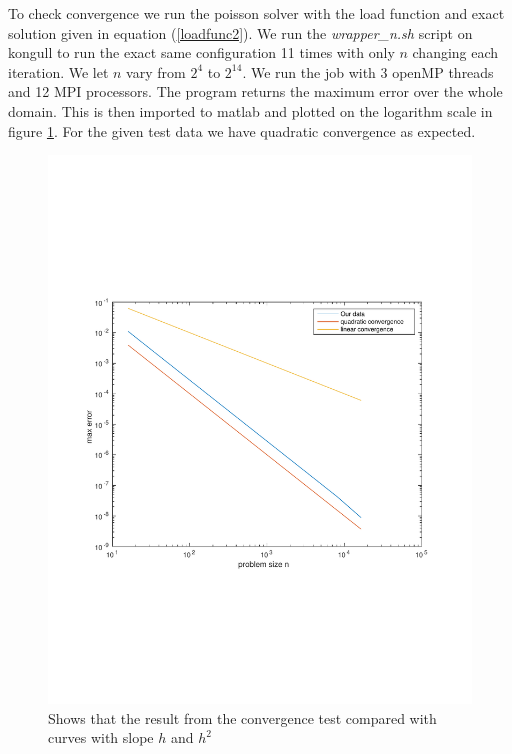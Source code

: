 To check convergence we run the poisson solver with the load function and exact solution given in equation (\ref{loadfunc2}). We run the \textit{wrapper\_n.sh} script on kongull to run the exact same configuration 11 times with only $n$ changing each iteration. We let $n$ vary from $2^4$ to $2^{14}$. We run the job with 3 openMP threads and 12 MPI processors. The program returns the maximum error over the whole domain. This is then imported to matlab and plotted on the logarithm scale in figure \ref{fig:checkConv}. For the given test data we have quadratic convergence as expected.


\begin{figure}[h]
\centering
\includegraphics[width=0.6\linewidth]{./figures/checkConv}
\caption{Shows that the result from the convergence test compared with curves with slope $h$ and $h^2$}
\label{fig:checkConv}
\end{figure}